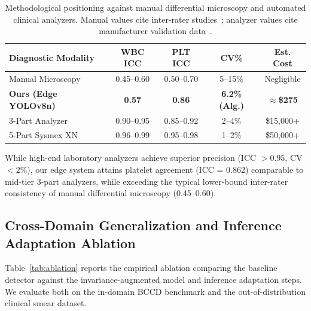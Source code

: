 \documentclass[10pt,conference]{IEEEtran}
\begin{document}
\begin{table}[!t]
\centering
\caption{Methodological positioning against manual differential microscopy and automated clinical analyzers. Manual values cite inter-rater studies~\cite{rumke1985}; analyzer values cite manufacturer validation data~\cite{sysmex2020, horiba2022}.}
\label{tab:analyzer_compare}
\setlength{\tabcolsep}{2.2pt}
\renewcommand{\arraystretch}{1.1}
\begin{tabular}{lcccc}
\toprule
\textbf{Diagnostic Modality} & \textbf{WBC ICC} & \textbf{PLT ICC} & \textbf{CV\%} & \textbf{Est. Cost} \\
\midrule
Manual Microscopy~\cite{rumke1985} & 0.45--0.60 & 0.50--0.70 & 5--15\% & Negligible \\
\textbf{Ours (Edge YOLOv8n)} & \textbf{0.57} & \textbf{0.86} & \textbf{6.2\% (Alg.)} & \textbf{$\approx$\$275} \\
3-Part Analyzer~\cite{who2011} & 0.90--0.95 & 0.85--0.92 & 2--4\% & \$15,000+ \\
5-Part Sysmex XN~\cite{sysmex2020} & 0.96--0.99 & 0.95--0.98 & 1--2\% & \$50,000+ \\
\bottomrule
\end{tabular}
\end{table}

While high-end laboratory analyzers achieve superior precision (ICC $> 0.95$, CV $< 2\%$), our edge system attains platelet agreement (ICC = 0.862) comparable to mid-tier 3-part analyzers, while exceeding the typical lower-bound inter-rater consistency of manual differential microscopy (0.45–0.60).

\subsection{Cross-Domain Generalization and Inference Adaptation Ablation}
\label{sec:ablation}
Table~\ref{tab:ablation} reports the empirical ablation comparing the baseline detector against the invariance-augmented model and inference adaptation steps. We evaluate both on the in-domain BCCD benchmark and the out-of-distribution clinical smear dataset.
\end{document}
